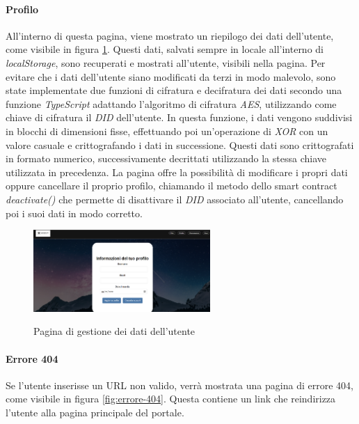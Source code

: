 \newpage
\paragraph{Profilo}

All'interno di questa pagina, viene mostrato un riepilogo dei dati dell'utente, come visibile in figura \ref{fig:profilo}.
Questi dati, salvati sempre in locale all'interno di \textit{localStorage}, sono recuperati e mostrati all'utente, visibili nella pagina.
Per evitare che i dati dell'utente siano modificati da terzi in modo malevolo, sono state implementate due funzioni di cifratura e decifratura 
dei dati secondo una funzione \textit{TypeScript} adattando l'algoritmo di cifratura \textit{AES}, utilizzando come chiave di cifratura il \textit{DID} dell'utente.
In questa funzione, i dati vengono suddivisi in blocchi di dimensioni fisse, effettuando poi un'operazione di \textit{XOR} con un valore casuale e crittografando i dati in successione.
Questi dati sono crittografati in formato numerico, successivamente decrittati utilizzando la stessa chiave utilizzata in precedenza.
La pagina offre la possibilità di modificare i propri dati oppure cancellare il proprio profilo, chiamando il metodo dello smart contract \textit{deactivate()}
che permette di disattivare il \textit{DID} associato all'utente, cancellando poi i suoi dati in modo corretto.
\begin{figure}[h]
    \centering
    \includegraphics[width=0.6\textwidth, alt={Schermata della pagina di gestione del profilo dell'utente}]{immagini/frontend/account.png}
    \caption{Pagina di gestione dei dati dell'utente}\label{fig:profilo}
\end{figure}

\paragraph{Errore 404}

Se l'utente inserisse un URL non valido, verrà mostrata una pagina di errore 404, come visibile in figura \ref{fig:errore-404}.
Questa contiene un link che reindirizza l'utente alla pagina principale del portale.

